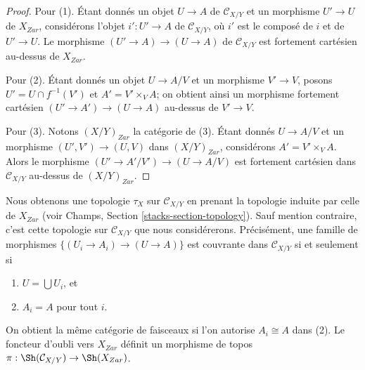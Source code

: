 \begin{proof}
Pour (1). Étant donnés un objet $U \to A$ de $\mathcal{C}_{X/Y}$ et un
morphisme $U' \to U$ de $X_{Zar}$, considérons l'objet $i' : U' \to A$ de
$\mathcal{C}_{X/Y}$, où $i'$ est le composé de $i$ et de $U' \to U$.
Le morphisme $(U' \to A) \to (U \to A)$ de $\mathcal{C}_{X/Y}$
est fortement cartésien au-dessus de $X_{Zar}$.

\medskip\noindent
Pour (2). Étant donnés un objet $U \to A/V$ et un morphisme $V' \to V$,
posons $U' = U \cap f^{-1}(V')$ et $A' = V' \times_V A$; on obtient ainsi
un morphisme fortement cartésien $(U' \to A') \to (U \to A)$ au-dessus de
$V' \to V$.

\medskip\noindent
Pour (3). Notons $(X/Y)_{Zar}$ la catégorie de (3). Étant donnés
$U \to A/V$ et un morphisme $(U', V') \to (U, V)$ dans $(X/Y)_{Zar}$,
considérons $A' = V' \times_V A$. Alors le morphisme
$(U' \to A'/V') \to (U \to A/V)$ est fortement cartésien dans
$\mathcal{C}_{X/Y}$ au-dessus de $(X/Y)_{Zar}$.
\end{proof}

\noindent
Nous obtenons une topologie $\tau_X$ sur $\mathcal{C}_{X/Y}$ en
prenant la topologie induite par celle de $X_{Zar}$ (voir
Champs, Section \ref{stacks-section-topology}). Sauf mention contraire,
c'est cette topologie sur $\mathcal{C}_{X/Y}$ que nous considérerons.
Précisément, une famille de morphismes
$\{(U_i \to A_i) \to (U \to A)\}$ est couvrante dans
$\mathcal{C}_{X/Y}$ si et seulement si
\begin{enumerate}
\item $U = \bigcup U_i$, et
\item $A_i = A$ pour tout $i$.
\end{enumerate}
On obtient la même catégorie de faisceaux si l'on autorise
$A_i \cong A$ dans (2). Le foncteur d'oubli vers $X_{Zar}$ définit un
morphisme de topos
$\pi : \Sh(\mathcal{C}_{X/Y}) \to \Sh(X_{Zar})$.

